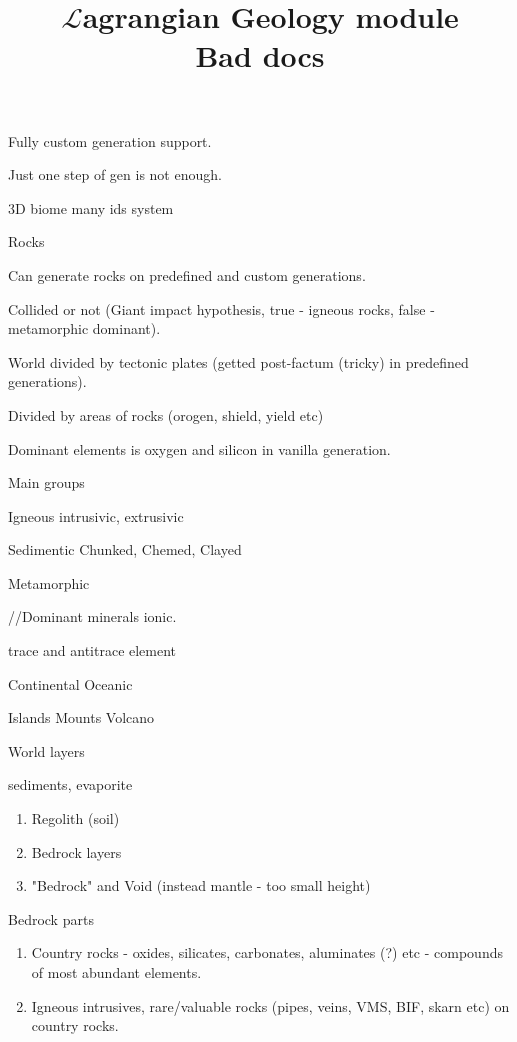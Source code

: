 \documentclass[12pt]{article}
\title{$\mathcal{L}$agrangian Geology module \\ Bad docs}
\begin{document}
    \maketitle

    Fully custom generation support.

    Just one step of gen is not enough.

    3D biome many ids system

    Rocks

    Can generate rocks on predefined and custom generations.  

    Collided or not (Giant impact hypothesis, true - igneous rocks, false - metamorphic dominant).

    World divided by tectonic plates (getted post-factum (tricky) in predefined generations).

    Divided by areas of rocks (orogen, shield, yield etc)

    Dominant elements is oxygen and silicon in vanilla generation.

    Main groups

    Igneous {intrusivic, extrusivic}

    Sedimentic {Chunked, Chemed, Clayed}

    Metamorphic {}

    //Dominant minerals ionic.

    trace and antitrace element

    Continental
    Oceanic

    Islands
    Mounts
    Volcano


    World layers

    sediments, evaporite

    \begin{enumerate}
        \item Regolith (soil)
        \item Bedrock layers
        \item "Bedrock" and Void (instead mantle - too small height)
    \end{enumerate}

    Bedrock parts

    \begin{enumerate}
        \item Country rocks - oxides, silicates, carbonates, aluminates (?) etc - compounds of most abundant elements.
        \item Igneous intrusives, rare/valuable rocks (pipes, veins, VMS, BIF, skarn etc) on country rocks.
    \end{enumerate}
\end{document}
